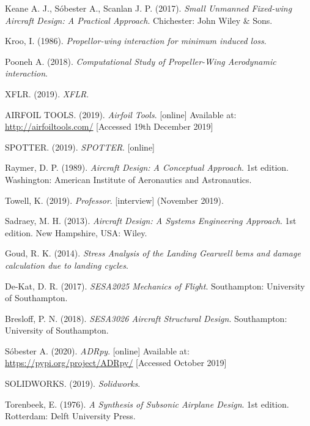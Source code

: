 \documentclass[../main.tex]{subfiles}
\begin{document}
\begin{thebibliography}{999}


  Keane A. J., S\'obester A., Scanlan J. P.
  (2017).
  \emph{Small Unmanned Fixed-wing Aircraft Design: A Practical Approach}.
  Chichester: John Wiley \& Sons.

  Kroo, I.
  (1986).
  \emph{Propellor-wing interaction for minimum induced loss}.

  Pooneh A.
  (2018).
  \emph{Computational Study of Propeller-Wing Aerodynamic interaction}.

  XFLR.
  (2019).
  \emph{XFLR}.

  AIRFOIL TOOLS.
  (2019).
  \emph{Airfoil Tools}.
  [online]
  Available at:
  \url{http://airfoiltools.com/}
  [Accessed 19th December 2019]

  SPOTTER.
  (2019).
  \emph{SPOTTER}.
  [online]

  Raymer, D. P.
  (1989).
  \emph{Aircraft Design: A Conceptual Approach}.
  1st edition.
  Washington: American Institute of Aeronautics and Astronautics.

  Towell, K.
  (2019).
  \emph{Professor}.
  [interview]
  (November 2019).

  Sadraey, M. H.
  (2013).
  \emph{Aircraft Design: A Systems Engineering Approach}.
  1st edition.
  New Hampshire, USA: Wiley.

  Goud, R. K.
  (2014).
  \emph{Stress Analysis of the Landing Gearwell bems and damage calculation due to landing cycles}.

  De-Kat, D. R.
  (2017).
  \emph{SESA2025 Mechanics of Flight}.
  Southampton: University of Southampton.

  Bresloff, P. N.
  (2018).
  \emph{SESA3026 Aircraft Structural Design}.
  Southampton: University of Southampton.

  S\'obester A.
  (2020).
  \emph{ADRpy}.
  [online]
  Available at:
  \url{https://pypi.org/project/ADRpy/}
  [Accessed October 2019]


  SOLIDWORKS.
  (2019).
  \emph{Solidworks}.

  Torenbeek, E.
  (1976).
  \emph{A Synthesis of Subsonic Airplane Design}.
  1st edition.
  Rotterdam: Delft University Press.

\end{thebibliography}
\end{document}
